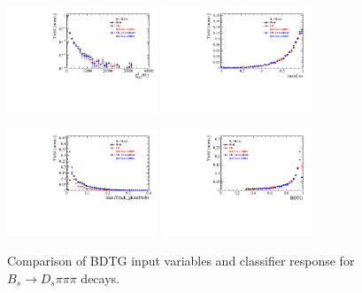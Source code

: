 \begin{figure}[h]
\includegraphics[height=!,width=0.4\textwidth]{figs/dataVsMC/norm_final/combined/Ds2KKpi_1_Ds_FDCHI2_ORIVX.pdf}
\includegraphics[height=!,width=0.4\textwidth]{figs/dataVsMC/norm_final/combined/Ds2KKpi_1_maxCos.pdf}

\includegraphics[height=!,width=0.4\textwidth]{figs/dataVsMC/norm_final/combined/Ds2KKpi_1_max_ghostProb.pdf}
\includegraphics[height=!,width=0.4\textwidth]{figs/dataVsMC/norm_final/combined/Ds2KKpi_1_BDTG_response.pdf}

\caption{Comparison of BDTG input variables and classifier response for $B_s\to D_s\pi\pi\pi$ decays.}
\label{fig:}
\end{figure}



